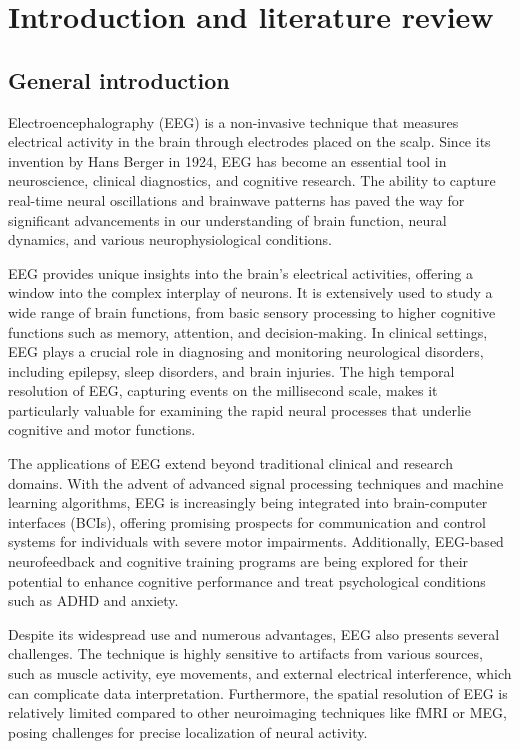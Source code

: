 \chapter{Introduction and literature review} \label{sec:intro}


\section{General introduction}

Electroencephalography (EEG) is a non-invasive technique that measures electrical activity in the brain through electrodes placed on the scalp. Since its invention by Hans Berger in 1924, EEG has become an essential tool in neuroscience, clinical diagnostics, and cognitive research. The ability to capture real-time neural oscillations and brainwave patterns has paved the way for significant advancements in our understanding of brain function, neural dynamics, and various neurophysiological conditions.

EEG provides unique insights into the brain's electrical activities, offering a window into the complex interplay of neurons. It is extensively used to study a wide range of brain functions, from basic sensory processing to higher cognitive functions such as memory, attention, and decision-making. In clinical settings, EEG plays a crucial role in diagnosing and monitoring neurological disorders, including epilepsy, sleep disorders, and brain injuries. The high temporal resolution of EEG, capturing events on the millisecond scale, makes it particularly valuable for examining the rapid neural processes that underlie cognitive and motor functions.

The applications of EEG extend beyond traditional clinical and research domains. With the advent of advanced signal processing techniques and machine learning algorithms, EEG is increasingly being integrated into brain-computer interfaces (BCIs), offering promising prospects for communication and control systems for individuals with severe motor impairments. Additionally, EEG-based neurofeedback and cognitive training programs are being explored for their potential to enhance cognitive performance and treat psychological conditions such as ADHD and anxiety.

Despite its widespread use and numerous advantages, EEG also presents several challenges. The technique is highly sensitive to artifacts from various sources, such as muscle activity, eye movements, and external electrical interference, which can complicate data interpretation. Furthermore, the spatial resolution of EEG is relatively limited compared to other neuroimaging techniques like fMRI or MEG, posing challenges for precise localization of neural activity.

